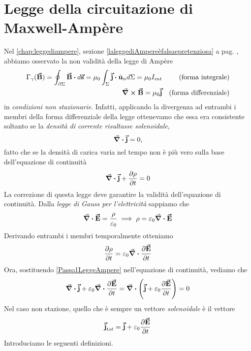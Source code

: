 \section{Legge della circuitazione di Maxwell-Ampère}
Nel \autoref{chap:leggediampere}, sezione \ref{laleggediAmpereèfalsaepretenziosa} a pag. \pageref{laleggediAmpereèfalsaepretenziosa}, abbiamo osservato la non validità della legge di Ampère
\begin{align*}
	\Gamma_{\gamma}(\vba{B})=\oint_{\partial \Sigma} \vba{B}\vdot d\vba{s}=\mu_0\int_{\Sigma}\vba{j}\vdot\vbh{u}_nd\Sigma=\mu_0 I_{int}	&& \left(\text{forma integrale}\right)\\
	\curl{\vba{B}}=\mu_0\vba{j}	&& \left(\text{forma differenziale}\right)\\
\end{align*}
in \textit{condizioni non stazionarie}. Infatti, applicando la divergenza ad entrambi i membri della forma differenziale della legge ottenevamo che essa era consistente soltanto se la \textit{densità di corrente risultasse solenoidale},
\begin{equation}
	\div{\vb*{\va{j}}}=0,
\end{equation}
fatto che se la densità di carica varia nel tempo non è più vero sulla base dell'equazione di continuità
\begin{equation*}
	\div{\vb*{\va{j}}}+\pdv{\rho}{t}=0
\end{equation*}
La correzione di questa legge deve garantire la validità dell'equazione di continuità.
Dalla \textit{legge di Gauss per l'elettricità} sappiamo che
\begin{equation*}
	\div{\vb*{\va{E}}}=\frac{\rho}{\varepsilon_0}\implies \rho=\varepsilon_0\div{\vb*{\va{E}}}
\end{equation*}
Derivando entrambi i membri temporalmente otteniamo
\begin{equation}
	\pdv{\rho}{t}=\varepsilon_0\div{\pdv{\vb*{\va{E}}}{t}}\label{Passo1LeggeAmpere}
\end{equation}
Ora, sostituendo \eqref{Passo1LeggeAmpere} nell'equazione di continuità, vediamo che
\begin{equation}
	\div{\vb*{\va{j}}}+\varepsilon_0\div{\pdv{\vb*{\va{E}}}{t}}=\div{\left(\vb*{\va{j}}+\varepsilon_0\pdv{\vb*{\va{E}}}{t}\right)}=0
\end{equation}
Nel caso non stazione, quello che è sempre un vettore \textit{solenoidale} è il vettore
\begin{equation*}
	\vb*{\va{j}}_{tot}=\vb*{\va{j}}+\varepsilon_0\pdv{\vb*{\va{E}}}{t}
\end{equation*}
Introduciamo le seguenti definizioni.
